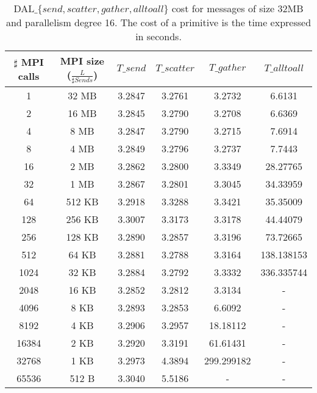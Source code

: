 \begin{table}[h]
\begin{center}
\begin{tabular}{|c|c|c|c|c|c|}\hline
\hline
$\sharp$ MPI calls & MPI size ($\frac{L}{\sharp Sends}$)  & $T\_send$   & $T\_scatter$  & $T\_gather$ & $T\_alltoall$      \\\hline\hline
1 & 32 MB & 3.2847 & 3.2761 & 3.2732 & 6.6131 \\\hline
2 & 16 MB & 3.2845 & 3.2790 & 3.2708 & 6.6369 \\\hline
4 & 8 MB & 3.2847 & 3.2790 & 3.2715 & 7.6914 \\\hline
8 & 4 MB & 3.2849 & 3.2796 & 3.2737 & 7.7443 \\\hline
16 & 2 MB & 3.2862 & 3.2800 & 3.3349 & 28.27765 \\\hline
32 & 1 MB & 3.2867 & 3.2801 & 3.3045 & 34.33959 \\\hline
64 & 512 KB & 3.2918 & 3.3288 & 3.3421 & 35.35009 \\\hline
128 & 256 KB & 3.3007 & 3.3173 & 3.3178 & 44.44079 \\\hline
256 & 128 KB & 3.2890 & 3.2857 & 3.3196 & 73.72665 \\\hline
512 & 64 KB & 3.2881 & 3.2788 & 3.3164 & 138.138153 \\\hline
1024 & 32 KB & 3.2884 & 3.2792 & 3.3332 & 336.335744 \\\hline
2048 & 16 KB & 3.2852 & 3.2812 & 3.3134 & - \\\hline
4096 & 8 KB & 3.2893 & 3.2853 & 6.6092 & - \\\hline
8192 & 4 KB & 3.2906 & 3.2957 & 18.18112 & - \\\hline
16384 & 2 KB & 3.2920 & 3.3191 & 61.61431 & - \\\hline
32768 & 1 KB & 3.2973 & 4.3894 & 299.299182 & - \\\hline
65536 & 512 B & 3.3040 & 5.5186 & - & - \\\hline
\end{tabular}
\caption{DAL$\_\lbrace send, scatter, gather, alltoall \rbrace$ cost for messages of size 32MB and parallelism degree 16. The cost of a primitive is the time expressed in seconds. }
\label{tsetup-pianosa-n16-M32}
\end{center}
\end{table}


